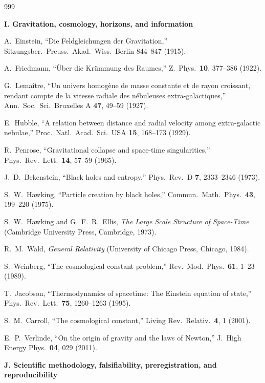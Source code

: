 \documentclass[11pt,a4paper,twoside]{book}
\theoremstyle{definition}
\begin{document}
\begin{thebibliography}{999}
\item[]\textbf{I. Gravitation, cosmology, horizons, and information}

A.~Einstein,
``Die Feldgleichungen der Gravitation,''
Sitzungsber.\ Preuss.\ Akad.\ Wiss.\ Berlin 844--847 (1915).

A.~Friedmann,
``\"Uber die Kr\"ummung des Raumes,''
Z.\ Phys.\ \textbf{10}, 377--386 (1922).

G.~Lema\^itre,
``Un univers homog\`ene de masse constante et de rayon croissant, rendant
compte de la vitesse radiale des n\'ebuleuses extra-galactiques,''
Ann.\ Soc.\ Sci.\ Bruxelles A \textbf{47}, 49--59 (1927).

E.~Hubble,
``A relation between distance and radial velocity among extra-galactic
nebulae,'' Proc.\ Natl.\ Acad.\ Sci.\ USA \textbf{15}, 168--173 (1929).

R.~Penrose,
``Gravitational collapse and space-time singularities,''
Phys.\ Rev.\ Lett.\ \textbf{14}, 57--59 (1965).

J.~D.~Bekenstein,
``Black holes and entropy,'' Phys.\ Rev.\ D \textbf{7}, 2333--2346 (1973).

S.~W.~Hawking,
``Particle creation by black holes,''
Commun.\ Math.\ Phys.\ \textbf{43}, 199--220 (1975).

S.~W.~Hawking and G.~F.~R.~Ellis,
\emph{The Large Scale Structure of Space-Time}
(Cambridge University Press, Cambridge, 1973).

R.~M.~Wald,
\emph{General Relativity}
(University of Chicago Press, Chicago, 1984).

S.~Weinberg,
``The cosmological constant problem,''
Rev.\ Mod.\ Phys.\ \textbf{61}, 1--23 (1989).

T.~Jacobson,
``Thermodynamics of spacetime: The Einstein equation of state,''
Phys.\ Rev.\ Lett.\ \textbf{75}, 1260--1263 (1995).

S.~M.~Carroll,
``The cosmological constant,''
Living Rev.\ Relativ.\ \textbf{4}, 1 (2001).

E.~P.~Verlinde,
``On the origin of gravity and the laws of Newton,''
J.\ High Energy Phys.\ \textbf{04}, 029 (2011).

\item[]\textbf{J. Scientific methodology, falsifiability, preregistration, and reproducibility}


\end{thebibliography}
\end{document}

